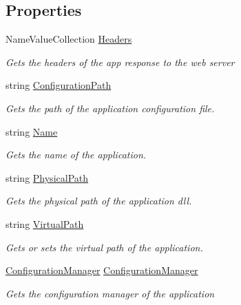 \subsection*{Properties}
\begin{DoxyCompactItemize}
\item 
Name\+Value\+Collection \hyperlink{class_mvc_1_1_p_http_application_aafb61bb03731b040d45a8dab426132fd}{Headers}
\begin{DoxyCompactList}\small\item\em Gets the headers of the app response to the web server \end{DoxyCompactList}\item 
string \hyperlink{class_mvc_1_1_p_http_application_a6b88e2d6ba56c3e26558310ef17a329d}{Configuration\+Path}
\begin{DoxyCompactList}\small\item\em Gets the path of the application configuration file. \end{DoxyCompactList}\item 
string \hyperlink{class_mvc_1_1_p_http_application_a49f7f8b5103b1141ab11b0e482af51fa}{Name}
\begin{DoxyCompactList}\small\item\em Gets the name of the application.\end{DoxyCompactList}\item 
string \hyperlink{class_mvc_1_1_p_http_application_acc2f12d716e578beb22a506aaf614491}{Physical\+Path}
\begin{DoxyCompactList}\small\item\em Gets the physical path of the application dll. \end{DoxyCompactList}\item 
string \hyperlink{class_mvc_1_1_p_http_application_a51d755edd9a7c81e6173730c75eae430}{Virtual\+Path}
\begin{DoxyCompactList}\small\item\em Gets or sets the virtual path of the application.\end{DoxyCompactList}\item 
\hyperlink{class_mvc_1_1_configuration_manager}{Configuration\+Manager} \hyperlink{class_mvc_1_1_p_http_application_a19b5b22d6422a32d76b113fecda86d88}{Configuration\+Manager}
\begin{DoxyCompactList}\small\item\em Gets the configuration manager of the application \end{DoxyCompactList}\end{DoxyCompactItemize}
